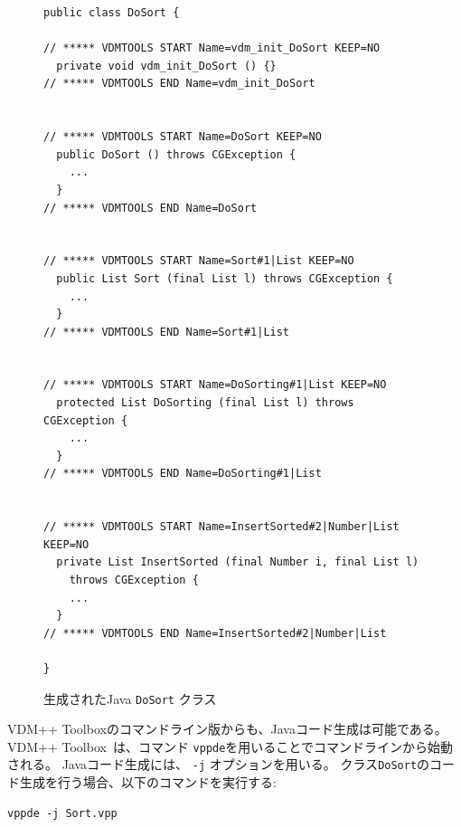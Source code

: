 \documentclass[\pformat,11pt]{jarticle}
\newcommand{\ToolboxName}{VDM++ Toolbox}
\newcommand{\vdmde}{vppde}
\begin{document}
\begin{figure}[!htb]
\begin{center}
\begin{small}
\begin{screen}
\begin{verbatim}  
public class DoSort {

// ***** VDMTOOLS START Name=vdm_init_DoSort KEEP=NO
  private void vdm_init_DoSort () {}
// ***** VDMTOOLS END Name=vdm_init_DoSort


// ***** VDMTOOLS START Name=DoSort KEEP=NO
  public DoSort () throws CGException {
    ...
  }
// ***** VDMTOOLS END Name=DoSort


// ***** VDMTOOLS START Name=Sort#1|List KEEP=NO
  public List Sort (final List l) throws CGException {
    ...
  }
// ***** VDMTOOLS END Name=Sort#1|List


// ***** VDMTOOLS START Name=DoSorting#1|List KEEP=NO
  protected List DoSorting (final List l) throws CGException {
    ...
  }
// ***** VDMTOOLS END Name=DoSorting#1|List


// ***** VDMTOOLS START Name=InsertSorted#2|Number|List KEEP=NO
  private List InsertSorted (final Number i, final List l)
    throws CGException {
    ...
  }
// ***** VDMTOOLS END Name=InsertSorted#2|Number|List

}
\end{verbatim}
\end{screen}
\end{small}
\caption{生成されたJava {\tt DoSort} クラス\label{fig:doSortJava}}
\end{center}
\end{figure}


 \ToolboxName のコマンドライン版からも、Javaコード生成は可能である。
 \ToolboxName\ は、コマンド {\tt \vdmde}を用いることでコマンドラインから始動される。 
Javaコード生成には、 {\tt -j} オプションを用いる。 
クラス{\tt DoSort}のコード生成を行う場合、以下のコマンドを実行する:

\begin{screen}
\begin{verbatim}
vppde -j Sort.vpp
\end{verbatim}
\end{screen}
\end{document}
